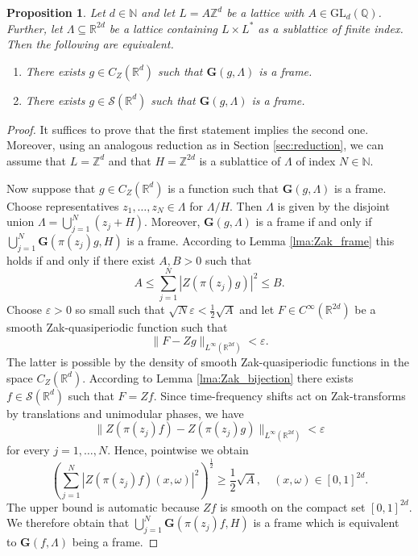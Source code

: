 \documentclass[reqno,a4paper,12pt]{amsart}
\numberwithin{equation}{section}
\newtheorem{proposition}[definition]{Proposition}
\def\N{{\mathbb N}}
\def\Z{{\mathbb Z}}
\def\R{{\mathbb R}}
\def\Q{{\mathbb Q}}
\newcommand{\Rd}{{\R^d}}
\newcommand\1{\mathds{1}}
\begin{document}
\begin{proposition}\label{prop:equivalence}
    Let $d \in \N$ and let $L=A\Z^d$ be a lattice with $A \in \mathrm{GL}_d(\Q)$. Further, let $\Lambda \subseteq \R^{2d}$ be a lattice containing $L \times L^*$ as a sublattice of finite index. Then the following are equivalent.
    \begin{enumerate}
        \item There exists $g \in C_Z(\Rd)$ such that $\mathbf{G}(g,\Lambda)$ is a frame.
        \item There exists $g \in \mathcal{S}(\Rd)$ such that $\mathbf{G}(g,\Lambda)$ is a frame.
    \end{enumerate}
\end{proposition}
\begin{proof}
    It suffices to prove that the first statement implies the second one. Moreover, using an analogous reduction as in Section \ref{sec:reduction}, we can assume that $L=\Z^d$ and that $H = \Z^{2d}$ is a sublattice of $\Lambda$ of index $N \in \N$.

    Now suppose that $g \in C_Z(\Rd)$ is a function such that $\mathbf{G}(g,\Lambda)$ is a frame. Choose representatives $z_1, \dots, z_N \in \Lambda$ for $\Lambda / H$. Then $\Lambda$ is given by the disjoint union
    $
    \Lambda = \bigcup_{j=1}^N (z_j + H).
    $
    Moreover, $\mathbf{G}(g,\Lambda)$ is a frame if and only if $\bigcup_{j=1}^N \mathbf{G}(\pi(z_j) g,H)$ is a frame. According to Lemma \ref{lma:Zak_frame} this holds if and only if there exist $A,B>0$ such that
    $$
    A \leq  \sum_{j=1}^N | Z(\pi(z_j)g) |^2 \leq B.
    $$
    Choose $\varepsilon>0$ so small such that $\sqrt{N} \varepsilon < \frac12 \sqrt{A}$ and let $F \in C^\infty(\R^{2d})$ be a smooth Zak-quasiperiodic function such that
    $$
    \| F- Zg \|_{L^\infty(\R^{2d})} < \varepsilon.
    $$
    The latter is possible by the density of smooth Zak-quasiperiodic functions in the space $C_Z(\Rd)$. According to Lemma \ref{lma:Zak_bijection} there exists $f \in \mathcal{S}(\Rd)$ such that $F = Zf$. Since time-frequency shifts act on Zak-transforms by translations and unimodular phases, we have
    $$
    \| Z(\pi(z_j)f) - Z(\pi(z_j)g) \|_{L^\infty(\R^{2d})} < \varepsilon
    $$
    for every $j = 1, \dots, N$. Hence, pointwise we obtain
    $$
    \left (  \sum_{j=1}^N |Z(\pi(z_j) f)(x,\omega)|^2 \right )^{\frac12} \geq \frac12 \sqrt{A}, \quad (x,\omega) \in [0,1]^{2d}.
    $$
    The upper bound is automatic because $Zf$ is smooth on the compact set $[0,1]^{2d}$. We therefore obtain that $\bigcup_{j=1}^N \mathbf{G}(\pi(z_j) f,H)$ is a frame which is equivalent to $\mathbf{G}( f,\Lambda)$ being a frame.
\end{proof}
\end{document}
